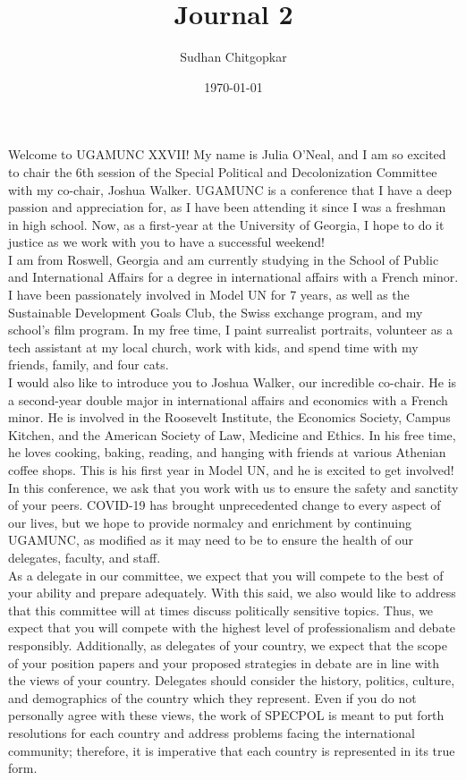 \documentclass[10pt, letterpaper]{article}
\title{Journal 2}
\author{Sudhan Chitgopkar}
\date{\today}
\begin{document}
Welcome to UGAMUNC XXVII! My name is Julia O'Neal, and I am so excited
to chair the 6th session of the Special Political and Decolonization
Committee with my co-chair, Joshua Walker. UGAMUNC is a conference that
I have a deep passion and appreciation for, as I have been attending it
since I was a freshman in high school. Now, as a first-year at the
University of Georgia, I hope to do it justice as we work with you to
have a successful weekend! \\

I am from Roswell, Georgia and am currently studying in the School of
Public and International Affairs for a degree in international affairs
with a French minor. I have been passionately involved in Model UN for 7
years, as well as the Sustainable Development Goals Club, the Swiss
exchange program, and my school's film program. In my free time, I paint
surrealist portraits, volunteer as a tech assistant at my local church,
work with kids, and spend time with my friends, family, and four cats. \\

I would also like to introduce you to Joshua Walker, our incredible
co-chair. He is a second-year double major in international affairs and
economics with a French minor. He is involved in the Roosevelt
Institute, the Economics Society, Campus Kitchen, and the American
Society of Law, Medicine and Ethics. In his free time, he loves cooking,
baking, reading, and hanging with friends at various Athenian coffee
shops. This is his first year in Model UN, and he is excited to get
involved! \\

In this conference, we ask that you work with us to ensure the safety
and sanctity of your peers. COVID-19 has brought unprecedented change to
every aspect of our lives, but we hope to provide normalcy and
enrichment by continuing UGAMUNC, as modified as it may need to be to
ensure the health of our delegates, faculty, and staff. \\

As a delegate in our committee, we expect that you will compete to the
best of your ability and prepare adequately. With this said, we also
would like to address that this committee will at times discuss
politically sensitive topics. Thus, we expect that you will compete with
the highest level of professionalism and debate responsibly.
Additionally, as delegates of your country, we expect that the scope of
your position papers and your proposed strategies in debate are in line
with the views of your country. Delegates should consider the history,
politics, culture, and demographics of the country which they represent.
Even if you do not personally agree with these views, the work of
SPECPOL is meant to put forth resolutions for each country and address
problems facing the international community; therefore, it is imperative
that each country is represented in its true form. \\
\end{document}
